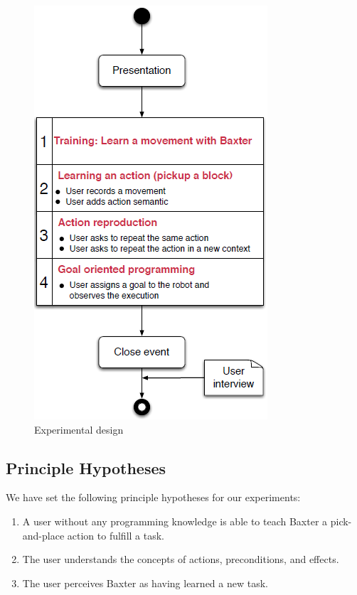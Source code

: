 \begin{figure}[h]
\begin{minipage}{.5\textwidth}
    \includegraphics[scale=0.56]{figures/protocole}
    \caption{Experimental design}
    \label{fig:Experimental design}
\end{minipage}
\end{figure}

\subsection{Principle Hypotheses}
We have set the following principle hypotheses for our experiments:
\begin{enumerate}
\item A user without any programming knowledge is able to teach Baxter a pick-and-place action to fulfill a task.
\item The user understands the concepts of actions, preconditions, and effects.
\item The user perceives Baxter as having learned a new task.
\end{enumerate}

